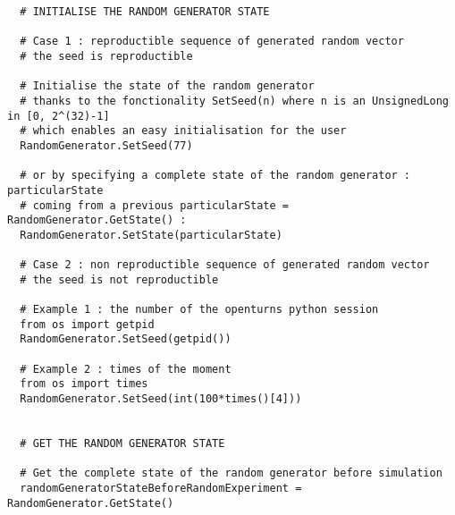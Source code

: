 \begin{lstlisting}
  # INITIALISE THE RANDOM GENERATOR STATE

  # Case 1 : reproductible sequence of generated random vector
  # the seed is reproductible

  # Initialise the state of the random generator
  # thanks to the fonctionality SetSeed(n) where n is an UnsignedLong in [0, 2^(32)-1]
  # which enables an easy initialisation for the user
  RandomGenerator.SetSeed(77)

  # or by specifying a complete state of the random generator : particularState
  # coming from a previous particularState = RandomGenerator.GetState() :
  RandomGenerator.SetState(particularState)

  # Case 2 : non reproductible sequence of generated random vector
  # the seed is not reproductible

  # Example 1 : the number of the openturns python session
  from os import getpid
  RandomGenerator.SetSeed(getpid())

  # Example 2 : times of the moment
  from os import times
  RandomGenerator.SetSeed(int(100*times()[4]))


  # GET THE RANDOM GENERATOR STATE

  # Get the complete state of the random generator before simulation
  randomGeneratorStateBeforeRandomExperiment = RandomGenerator.GetState()
\end{lstlisting}
